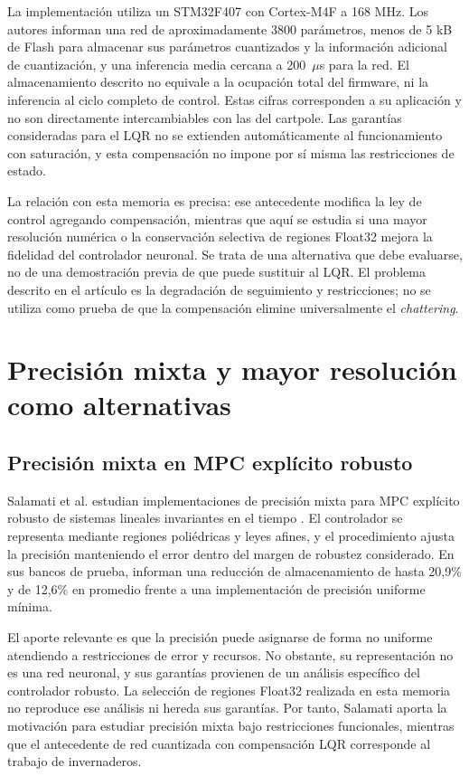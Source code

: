 La implementación utiliza un STM32F407 con Cortex-M4F a 168 MHz. Los autores informan una red de aproximadamente 3800 parámetros, menos de 5 kB de Flash para almacenar sus parámetros cuantizados y la información adicional de cuantización, y una inferencia media cercana a 200~$\mu$s para la red. El almacenamiento descrito no equivale a la ocupación total del firmware, ni la inferencia al ciclo completo de control. Estas cifras corresponden a su aplicación y no son directamente intercambiables con las del cartpole. Las garantías consideradas para el LQR no se extienden automáticamente al funcionamiento con saturación, y esta compensación no impone por sí misma las restricciones de estado.

La relación con esta memoria es precisa: ese antecedente modifica la ley de control agregando compensación, mientras que aquí se estudia si una mayor resolución numérica o la conservación selectiva de regiones Float32 mejora la fidelidad del controlador neuronal. Se trata de una alternativa que debe evaluarse, no de una demostración previa de que puede sustituir al LQR. El problema descrito en el artículo es la degradación de seguimiento y restricciones; no se utiliza como prueba de que la compensación elimine universalmente el \emph{chattering}.

\section{Precisión mixta y mayor resolución como alternativas}
\subsection{Precisión mixta en MPC explícito robusto}
Salamati et al. estudian implementaciones de precisión mixta para MPC explícito robusto de sistemas lineales invariantes en el tiempo \cite{salamati2019}. El controlador se representa mediante regiones poliédricas y leyes afines, y el procedimiento ajusta la precisión manteniendo el error dentro del margen de robustez considerado. En sus bancos de prueba, informan una reducción de almacenamiento de hasta 20,9\% y de 12,6\% en promedio frente a una implementación de precisión uniforme mínima.

El aporte relevante es que la precisión puede asignarse de forma no uniforme atendiendo a restricciones de error y recursos. No obstante, su representación no es una red neuronal, y sus garantías provienen de un análisis específico del controlador robusto. La selección de regiones Float32 realizada en esta memoria no reproduce ese análisis ni hereda sus garantías. Por tanto, Salamati aporta la motivación para estudiar precisión mixta bajo restricciones funcionales, mientras que el antecedente de red cuantizada con compensación LQR corresponde al trabajo de invernaderos.

